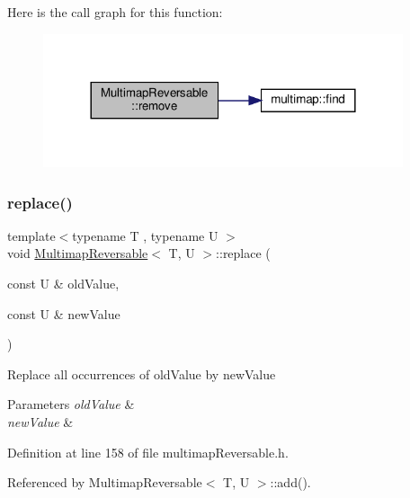 Here is the call graph for this function\+:
\nopagebreak
\begin{figure}[H]
\begin{center}
\leavevmode
\includegraphics[width=300pt]{classMultimapReversable_a11a0f10468c240813178e0a3f682eef5_cgraph}
\end{center}
\end{figure}
\mbox{\label{classMultimapReversable_ad3add05f4631934cacf20b258ca97efc}} 
\subsubsection{\texorpdfstring{replace()}{replace()}}
{\footnotesize\ttfamily template$<$typename T , typename U $>$ \\
void \hyperlink{classMultimapReversable}{Multimap\+Reversable}$<$ T, U $>$\+::replace (\begin{DoxyParamCaption}\item[{const U \&}]{old\+Value,  }\item[{const U \&}]{new\+Value }\end{DoxyParamCaption})\hspace{0.3cm}{\ttfamily [inline]}}

Replace all occurrences of old\+Value by new\+Value 
\begin{DoxyParams}{Parameters}
{\em old\+Value} & \\
\hline
{\em new\+Value} & \\
\hline
\end{DoxyParams}


Definition at line 158 of file multimap\+Reversable.\+h.



Referenced by Multimap\+Reversable$<$ T, U $>$\+::add().

\mbox{\label{classMultimapReversable_afaf809098df54c5619f06a71507214a4}} 
